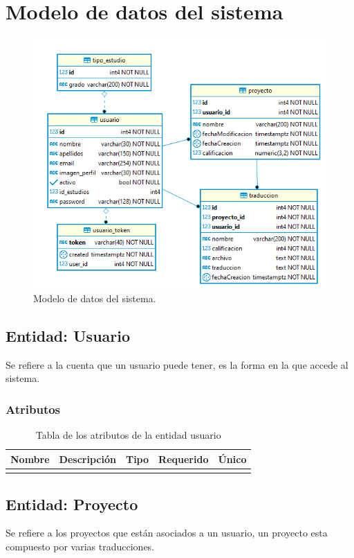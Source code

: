 \section{Modelo de datos del sistema}
\begin{figure}[h]
	\centering
	\includegraphics[width=\textwidth]{capitulo4/imagenes/tt_base.png}
	\caption{Modelo de datos del sistema.}
	\label{fig:db}
\end{figure}

\subsection{Entidad: Usuario}
Se refiere a la cuenta que un usuario puede tener, es la forma en la que accede al sistema.
\subsubsection{Atributos}
\begin{center}
	\begin{longtable}{|J{4cm}|J{4cm}|J{3cm}|J{2cm}|J{2cm}|}
		\hline
		\textbf{Nombre} & \textbf{Descripción} & \textbf{Tipo} & \textbf{Requerido} & \textbf{Único} \\ \hline
		\caption{Tabla de los atributos de la entidad usuario}
		\label{tbl:entidad-usuario}
	\end{longtable}
\end{center}
\subsection{Entidad: Proyecto}
Se refiere a los proyectos que están asociados a un usuario, un proyecto esta compuesto por varias traducciones.
